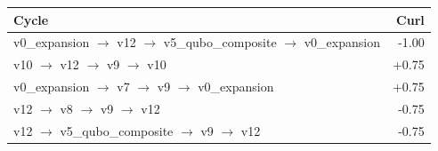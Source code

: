 \begin{tabular}{lr}
\toprule
Cycle & Curl \\
\midrule
v0\_expansion $\to$ v12 $\to$ v5\_qubo\_composite $\to$ v0\_expansion & -1.00 \\
v10 $\to$ v12 $\to$ v9 $\to$ v10 & +0.75 \\
v0\_expansion $\to$ v7 $\to$ v9 $\to$ v0\_expansion & +0.75 \\
v12 $\to$ v8 $\to$ v9 $\to$ v12 & -0.75 \\
v12 $\to$ v5\_qubo\_composite $\to$ v9 $\to$ v12 & -0.75 \\
\bottomrule
\end{tabular}
